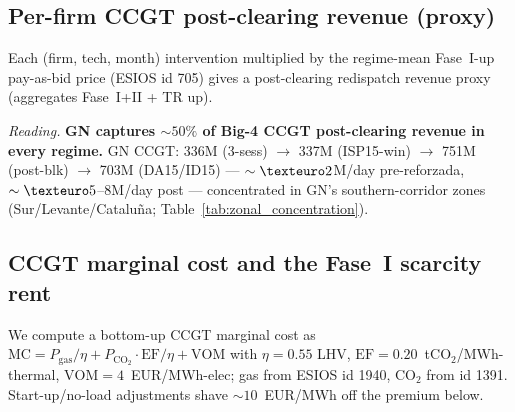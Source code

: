 \documentclass[11pt,a4paper]{article}
\begin{document}
\subsection{Per-firm CCGT post-clearing revenue (proxy)}\label{sec:prov:phf_minus_pdbf:revenue}

\noindent Each (firm, tech, month) intervention multiplied by the regime-mean Fase~I-up pay-as-bid price (ESIOS id 705) gives a post-clearing redispatch revenue proxy (aggregates Fase~I+II + TR up).

\begin{table}[H]
\centering\scriptsize
\caption{\textbf{Per-firm CCGT up-redispatch revenue (proxy), EUR million per regime window.} Big-4 sum in DA15/ID15 ($\sim\texteuro 1{,}390$M) is close to the REE-published Fase~I-up cost ($\texteuro 1{,}200$M in Table~\ref{tab:cascade_costs_official}); the $\sim\!15\%$ overshoot reflects TR-up and Fase~II-up inclusion.}
\label{tab:ccgt_post_clearing_rev}
\setlength{\tabcolsep}{4pt}

\end{table}

\textit{Reading.} \textbf{GN captures $\sim\!50\%$ of Big-4 CCGT post-clearing revenue in every regime.} GN CCGT: \texteuro 336M (3-sess) $\to$ \texteuro 337M (ISP15-win) $\to$ \texteuro 751M (post-blk) $\to$ \texteuro 703M (DA15/ID15) --- $\sim\texteuro 2$M/day pre-reforzada, $\sim\texteuro 5$--$8$M/day post --- concentrated in GN's southern-corridor zones (Sur/Levante/Cataluña; Table~\ref{tab:zonal_concentration}).

\subsection{CCGT marginal cost and the Fase~I scarcity rent}\label{sec:prov:phf_minus_pdbf:mc}

\noindent We compute a bottom-up CCGT marginal cost as $\mathrm{MC} = P_{\text{gas}}/\eta + P_{\text{CO}_2}\cdot\mathrm{EF}/\eta + \mathrm{VOM}$ with $\eta = 0.55$ LHV, $\mathrm{EF} = 0.20$~tCO$_2$/MWh-thermal, $\mathrm{VOM} = 4$~EUR/MWh-elec; gas from ESIOS id 1940, CO$_2$ from id 1391. Start-up/no-load adjustments shave $\sim\!10$~EUR/MWh off the premium below.
\end{document}
